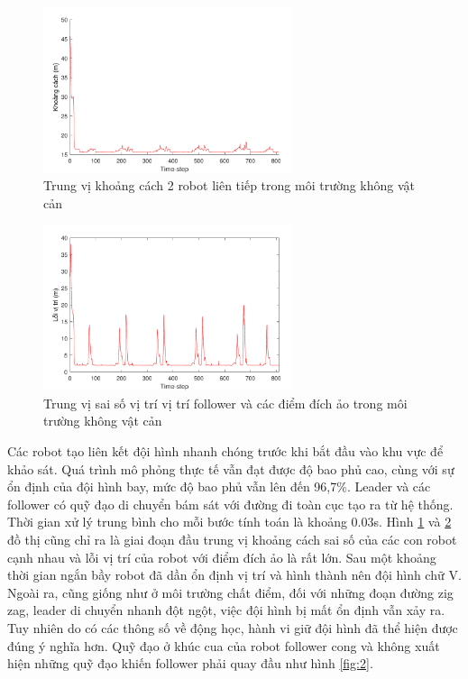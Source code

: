 \begin{figure}[H]
    \centering
    \includegraphics[width=0.65\textwidth]{chapter5/image/Median_Dis1.pdf}
    \caption{Trung vị khoảng cách 2 robot liên tiếp trong môi trường không vật cản}
    \label{fig:errdis}
\end{figure}

\begin{figure}[H]
    \centering
    \includegraphics[width=0.65\textwidth]{chapter5/image/Median_Err1.pdf}
    \caption{Trung vị sai số vị trí vị trí follower và các điểm đích ảo trong môi trường không vật cản}
    \label{fig:errpos}
\end{figure}
Các robot tạo liên kết đội hình nhanh chóng trước khi bắt đầu vào khu vực để khảo sát. Quá trình mô phỏng thực tế vẫn đạt được độ bao phủ cao, cùng với sự ổn định của đội hình bay, mức độ bao phủ vẫn lên đến 96,7$\%$. Leader và các follower có quỹ đạo di chuyển bám sát với đường đi toàn cục tạo ra từ hệ thống. Thời gian xử lý trung bình cho mỗi bước tính toán là khoảng 0.03s.  Hình \ref{fig:errdis} và  \ref{fig:errpos} đồ thị cũng chỉ ra là giai đoạn đầu trung vị khoảng cách sai số của các con robot cạnh nhau và lỗi vị trí của robot với điểm đích ảo là rất lớn. Sau một khoảng thời gian ngắn bầy robot đã dần ổn định vị trí và hình thành nên đội hình chữ V. Ngoài ra, cũng giống như ở môi trường chất điểm, đối với những đoạn đường zig zag, leader di chuyển nhanh đột ngột, việc đội hình bị mất ổn định vẫn xảy ra. Tuy nhiên do có các thông số về động học, hành vi giữ đội hình đã thể hiện được đúng ý nghĩa hơn. Quỹ đạo ở khúc cua của robot follower cong và không xuất hiện những quỹ đạo khiến follower phải quay đầu như hình \ref{fig:2}. 

